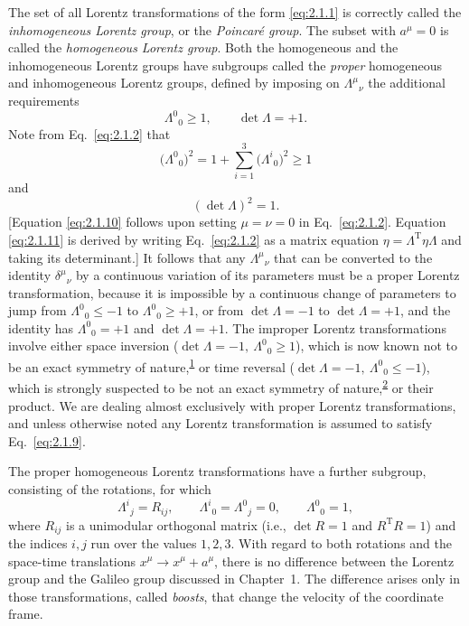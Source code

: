 The set of all Lorentz transformations of the form \eqref{eq:2.1.1} is
correctly called the \emph{inhomogeneous Lorentz group}, or the
\emph{Poincar\'e group}. The subset with \(a^\mu=0\) is called the
\emph{homogeneous Lorentz group}. Both the homogeneous and the inhomogeneous
Lorentz groups have subgroups called the \emph{proper} homogeneous and
inhomogeneous Lorentz groups, defined by imposing on
\(\Lambda^\mu{}_\nu\) the additional requirements
\begin{equation}
  \Lambda^0{}_0\geq 1,\qquad \det\Lambda=+1 .
  \tag{2.1.9}\label{eq:2.1.9}
\end{equation}
Note from Eq.~\eqref{eq:2.1.2} that
\begin{equation}
  \bigl(\Lambda^0{}_0\bigr)^2
  =1+\sum_{i=1}^{3}\bigl(\Lambda^i{}_0\bigr)^2\geq1
  \tag{2.1.10}\label{eq:2.1.10}
\end{equation}
and
\begin{equation}
  (\det\Lambda)^2=1 .
  \tag{2.1.11}\label{eq:2.1.11}
\end{equation}
[Equation \eqref{eq:2.1.10} follows upon setting \(\mu=\nu=0\) in
Eq.~\eqref{eq:2.1.2}. Equation \eqref{eq:2.1.11} is derived by writing
Eq.~\eqref{eq:2.1.2} as a matrix equation
\(\eta=\Lambda^{\mathrm T}\eta\Lambda\) and taking its determinant.]
It follows that any \(\Lambda^\mu{}_\nu\) that can be converted to the identity
\(\delta^\mu{}_\nu\) by a continuous variation of its parameters must be a
proper Lorentz transformation, because it is impossible by a continuous change
of parameters to jump from \(\Lambda^0{}_0\leq-1\) to
\(\Lambda^0{}_0\geq+1\), or from \(\det\Lambda=-1\) to
\(\det\Lambda=+1\), and the identity has \(\Lambda^0{}_0=+1\) and
\(\det\Lambda=+1\). The improper Lorentz transformations involve either space
inversion (\(\det\Lambda=-1,\ \Lambda^0{}_0\geq1\)), which is now known not
to be an exact symmetry of nature,\textsuperscript{\hyperref[ch2-ref-1]{1}} or
time reversal (\(\det\Lambda=-1,\ \Lambda^0{}_0\leq-1\)), which is strongly
suspected to be not an exact symmetry of
nature,\textsuperscript{\hyperref[ch2-ref-2]{2}} or their product. We are
dealing almost exclusively with proper Lorentz transformations, and unless
otherwise noted any Lorentz transformation is assumed to satisfy
Eq.~\eqref{eq:2.1.9}.

The proper homogeneous Lorentz transformations have a further subgroup,
consisting of the rotations, for which
\[
  \Lambda^i{}_j=R_{ij},\qquad
  \Lambda^i{}_0=\Lambda^0{}_j=0,\qquad
  \Lambda^0{}_0=1 ,
\]
where \(R_{ij}\) is a unimodular orthogonal matrix (i.e.,
\(\det R=1\) and \(R^{\mathrm T}R=1\)) and the indices \(i,j\) run over the
values \(1,2,3\). With regard to both rotations and the space-time translations
\(x^\mu\to x^\mu+a^\mu\), there is no difference between the Lorentz group and
the Galileo group discussed in Chapter~1. The difference arises only in those
transformations, called \emph{boosts}, that change the velocity of the coordinate
frame.


